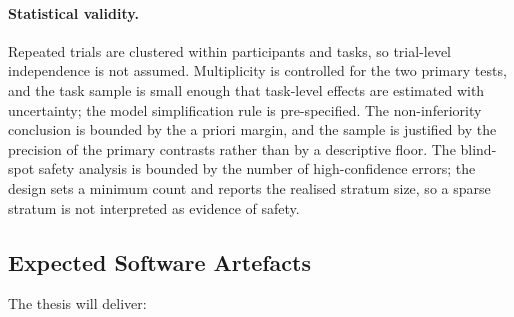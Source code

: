 \documentclass[oneside,final,14pt,a4paper]{extreport}
\begin{document}
\paragraph{Statistical validity.}
Repeated trials are clustered within participants and tasks, so trial-level
independence is not assumed. Multiplicity is controlled for the two primary
tests, and the task sample is small enough that task-level effects are estimated
with uncertainty; the model simplification rule is pre-specified. The
non-inferiority conclusion is bounded by the a priori margin, and the sample is
justified by the precision of the primary contrasts rather than by a descriptive
floor. The blind-spot safety analysis is bounded by the number of
high-confidence errors; the design sets a minimum count and reports the realised
stratum size, so a sparse stratum is not interpreted as evidence of safety.

\subsection{Expected Software Artefacts}

The thesis will deliver:
\end{document}
